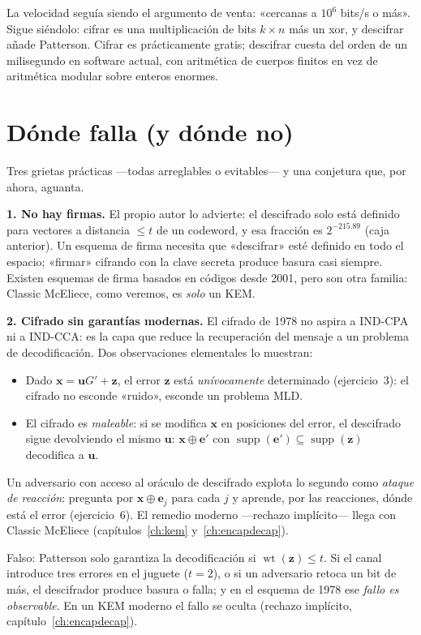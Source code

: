 \documentclass[11pt,a4paper,oneside]{report}
\newcommand{\wt}{\operatorname{wt}}
\newcommand{\supp}{\operatorname{supp}}
\newcommand{\ve}{\mathbf{e}}
\newcommand{\vx}{\mathbf{x}}
\newcommand{\vu}{\mathbf{u}}
\newcommand{\vz}{\mathbf{z}}
\begin{document}
La velocidad seguía siendo el argumento de venta: «cercanas a $10^6$
bits/s o más». Sigue siéndolo: cifrar es una multiplicación de bits
$k\times n$ más un xor, y descifrar añade Patterson. Cifrar es
prácticamente gratis; descifrar cuesta del orden de un milisegundo en
software actual, con aritmética de cuerpos finitos en vez de aritmética
modular sobre enteros enormes.

\section{Dónde falla (y dónde no)}

Tres grietas prácticas —todas arreglables o evitables— y una conjetura
que, por ahora, aguanta.

\smallskip
\noindent\textbf{1. No hay firmas.} El propio autor lo advierte: el
descifrado solo está definido para vectores a distancia $\le t$ de un
codeword, y esa fracción es $2^{-215.89}$ (caja anterior). Un esquema
de firma necesita que «descifrar» esté definido en todo el espacio;
«firmar» cifrando con la clave secreta produce basura casi siempre.
Existen esquemas de firma basados en códigos desde 2001, pero son otra
familia: Classic McEliece, como veremos, es \emph{solo} un KEM.

\smallskip
\noindent\textbf{2. Cifrado sin garantías modernas.} El cifrado de
1978 no aspira a IND-CPA ni a IND-CCA: es la capa que reduce la
recuperación del mensaje a un problema de decodificación. Dos
observaciones elementales lo muestran:
\begin{itemize}[leftmargin=1.4em,itemsep=2pt]
  \item Dado $\vx=\vu G'+\vz$, el error $\vz$ está
        \emph{unívocamente} determinado (ejercicio~3): el cifrado no
        esconde «ruido», esconde un problema MLD.
  \item El cifrado es \emph{maleable}: si se modifica $\vx$ en
        posiciones del error, el descifrado sigue devolviendo el
        mismo $\vu$: $\vx\oplus\ve'$ con
        $\supp(\ve')\subseteq\supp(\vz)$ decodifica a $\vu$.
\end{itemize}
Un adversario con acceso al oráculo de descifrado explota lo segundo
como \emph{ataque de reacción}: pregunta por $\vx\oplus\ve_j$ para
cada $j$ y aprende, por las reacciones, dónde está el error
(ejercicio~6). El remedio moderno —rechazo implícito— llega con
Classic McEliece (capítulos~\ref{ch:kem} y~\ref{ch:encapdecap}).

\begin{trampa}
Falso: Patterson solo garantiza la decodificación si $\wt(\vz)\le t$.
Si el canal introduce tres errores en el juguete ($t=2$), o si un
adversario retoca un bit de más, el descifrador produce basura o falla;
y en el esquema de 1978 ese \emph{fallo es observable}. En un KEM
moderno el fallo se oculta (rechazo implícito,
capítulo~\ref{ch:encapdecap}).
\end{trampa}
\end{document}
